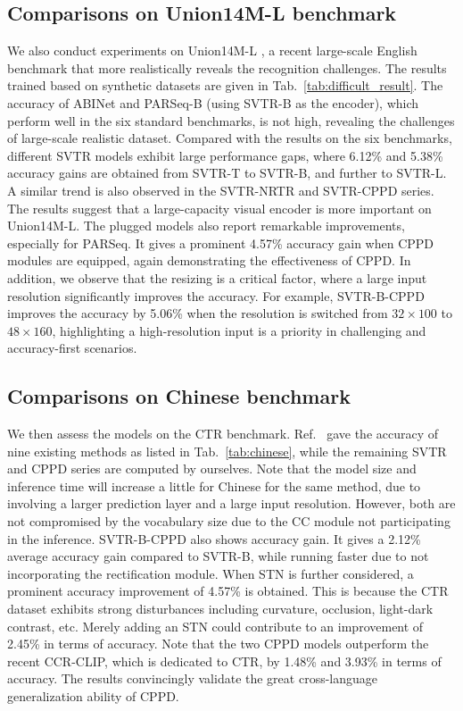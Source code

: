 \documentclass[10pt,journal,compsoc]{IEEEtran}
\begin{document}
\subsection{Comparisons on Union14M-L benchmark}
We also conduct experiments on Union14M-L \cite{jiang2023revisiting}, a recent large-scale English benchmark that more realistically reveals the recognition challenges. The results trained based on synthetic datasets are given in Tab.~\ref{tab:difficult_result}. The accuracy of ABINet and PARSeq-B (using SVTR-B as the encoder), which perform well in the six standard benchmarks, is not high, revealing the challenges of large-scale realistic dataset. Compared with the results on the six benchmarks, different SVTR models exhibit large performance gaps, where 6.12\% and 5.38\% accuracy gains are obtained from SVTR-T to SVTR-B, and further to SVTR-L. A similar trend is also observed in the SVTR-NRTR and SVTR-CPPD series. The results suggest that a large-capacity visual encoder is more important on Union14M-L. The plugged models also report remarkable improvements, especially for PARSeq. It gives a prominent 4.57\% accuracy gain when CPPD modules are equipped, again demonstrating the effectiveness of CPPD. In addition, we observe that the resizing is a critical factor, where a large input resolution significantly improves the accuracy. For example, SVTR-B-CPPD improves the accuracy by 5.06\% when the resolution is switched from $32\times100$ to $48\times160$, highlighting a high-resolution input is a priority in challenging and accuracy-first scenarios.

\subsection{Comparisons on Chinese benchmark}
We then assess the models on the CTR benchmark. Ref.~\cite{yuICCV2023clipctr} gave the accuracy of nine existing methods as listed in Tab.~\ref{tab:chinese}, while the remaining SVTR and CPPD series are computed by ourselves. Note that the model size and inference time will increase a little for Chinese for the same method, due to involving a larger prediction layer and a large input resolution. However, both are not compromised by the vocabulary size due to the CC module not participating in the inference. SVTR-B-CPPD also shows accuracy gain. It gives a 2.12\% average accuracy gain compared to SVTR-B, while running faster due to not incorporating the rectification module. When STN is further considered, a prominent accuracy improvement of 4.57\% is obtained. This is because the CTR dataset exhibits strong disturbances including curvature, occlusion, light-dark contrast, etc. Merely adding an STN could contribute to an improvement of 2.45\% in terms of accuracy. Note that the two CPPD models outperform the recent CCR-CLIP, which is dedicated to CTR, by 1.48\% and 3.93\% in terms of accuracy. The results convincingly validate the great cross-language generalization ability of CPPD. 
\end{document}
